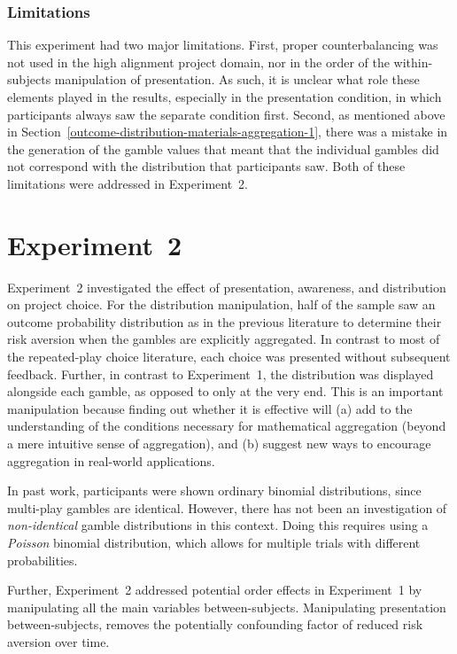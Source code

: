 \documentclass[a4paper, nobind]{templates/ociamthesis}
\theoremstyle{definition}
\theoremstyle{definition}
\theoremstyle{definition}
\theoremstyle{definition}
\theoremstyle{remark}
\begin{document}
\subsubsection{Limitations}

This experiment had two major limitations. First, proper counterbalancing was
not used in the high alignment project domain, nor in the order of the
within-subjects manipulation of presentation. As such, it is unclear what role
these elements played in the results, especially in the presentation condition,
in which participants always saw the separate condition first. Second, as
mentioned above in Section~\ref{outcome-distribution-materials-aggregation-1},
there was a mistake in the generation of the gamble values that meant that the
individual gambles did not correspond with the distribution that participants
saw. Both of these limitations were addressed in Experiment~2.

\hypertarget{aggregation-2}{%
\section{Experiment~2}\label{aggregation-2}}

Experiment~2 investigated the effect of presentation, awareness, and
distribution on project choice. For the distribution manipulation, half of the
sample saw an outcome probability distribution as in the previous literature
\autocites[e.g.,][]{redelmeier1992,webb2017} to determine their risk aversion when the
gambles are explicitly aggregated. In contrast to most of the repeated-play
choice literature, each choice was presented without subsequent feedback.
Further, in contrast to Experiment~1, the distribution was displayed alongside
each gamble, as opposed to only at the very end. This is an important
manipulation because finding out whether it is effective will (a) add to the
understanding of the conditions necessary for mathematical aggregation (beyond a
mere intuitive sense of aggregation), and (b) suggest new ways to encourage
aggregation in real-world applications.

In past work, participants were shown ordinary binomial distributions, since
multi-play gambles are identical. However, there has not been an investigation
of \emph{non-identical} gamble distributions in this context. Doing this requires
using a \emph{Poisson} binomial distribution, which allows for multiple trials with
different probabilities.

Further, Experiment~2 addressed potential order effects in Experiment~1 by
manipulating all the main variables between-subjects. Manipulating presentation
between-subjects, removes the potentially confounding factor of reduced risk
aversion over time.
\end{document}
